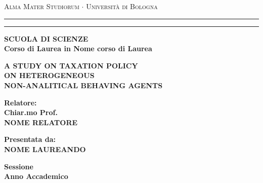 
\begin{titlepage}
    \textwidth=450pt\oddsidemargin=0pt
    \begin{center}
    {{\Large{\textsc{Alma Mater Studiorum $\cdot$ Universit\`a di
    Bologna}}}} \rule[0.1cm]{15.8cm}{0.1mm}
    \rule[0.5cm]{15.8cm}{0.6mm}
    {\small{\bf SCUOLA DI SCIENZE\\
    Corso di Laurea in Nome corso di Laurea }}
    \end{center}
    \vspace{15mm}
    \begin{center}
    {\Large{\bf A STUDY ON TAXATION POLICY}}\\
    \vspace{3mm}
    {\Large{\bf   ON HETEROGENEOUS }}\\
    \vspace{3mm}
    {\Large{\bf NON-ANALITICAL BEHAVING AGENTS}}\\
    \end{center}
    \vspace{40mm}
    \par
    \noindent
    \begin{minipage}[t]{0.47\textwidth}
    {\large{\bf Relatore:\\
    Chiar.mo Prof.\\
    NOME RELATORE}}
    \end{minipage}
    \hfill
    \begin{minipage}[t]{0.47\textwidth}\raggedleft
    {\large{\bf Presentata da:\\
    NOME LAUREANDO}}
    \end{minipage}
    \vspace{20mm}
    \begin{center}
    {\large{\bf Sessione\\%
    Anno Accademico }}%
    \end{center}
    \end{titlepage}